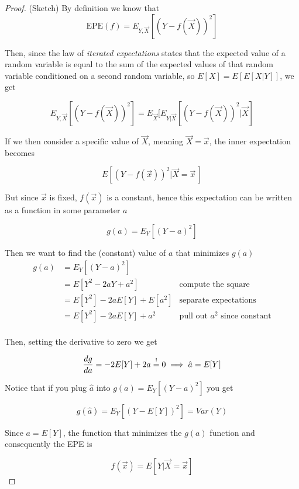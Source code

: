     \begin{proof}
      (Sketch)
      By definition we know that
      $$\text{EPE}(f) = E_{Y,\vec{X}}[(Y-f(\vec{X}))^2]$$

      Then, since the law of \textit{iterated expectations} states that the expected value of a random variable is equal to the sum of the expected values of that random variable conditioned on a second random variable, so $E[X] = E[E[X|Y]]$, we get 

      $$E_{Y,\vec{X}}[(Y-f(\vec{X}))^2] = E_{\vec{X}}[E_{Y|\vec{X}}[(Y-f(\vec{X}))^2| \vec{X}]$$
      
      If we then consider a specific value of $\vec{X}$, meaning $\vec{X} = \vec{x}$, the inner expectation becomes 
      
      $$E[(Y-f(\vec{x}))^2 | \vec{X} = \vec{x}\,] $$
      
      But since $\vec{x}$ is fixed, $f(\vec{x})$ is a constant, hence this expectation can be written as a function in some parameter $a$

      $$g(a) = E_{Y}[(Y-a)^2]$$

      Then we want to find the (constant) value of $a$ that minimizes $g(a)$
      \begin{align*}
        g(a) & = E_{Y}[(Y-a)^2]               & \\
             & = E[Y^2 - 2aY + a^2]           & \text{compute the square} \\
             & = E[Y^2] -2aE[Y] + E[a^2]      & \text{separate expectations} \\
             & = E[Y^2] -2aE[Y] + a^2         & \text{pull out } a^2 \text{ since constant} \\
      \end{align*}

      Then, setting the derivative to zero we get 

      $$\frac{dg}{da} = -2E[Y] + 2a \overset{!}{=} 0 \implies \hat{a} = E[Y]$$

      Notice that if you plug $\hat{a}$ into $g(a) = E_{Y}[(Y-a)^2]$ you get

      $$g(\hat{a}) = E_{Y}[(Y-E[Y])^2] = Var(Y)$$
      
      Since $a = E[Y]$, the function that minimizes the $ g(a) $ function and consequently the EPE is 

      $$f(\vec{x}) = E[Y|\vec{X} = \vec{x}]$$
    \end{proof}

